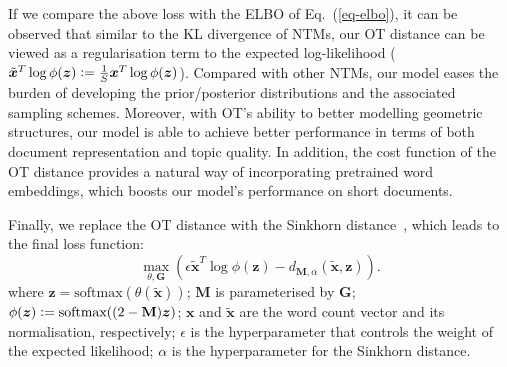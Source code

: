 \documentclass{article}
\renewcommand{\vec}{\boldsymbol}
\newcommand{\matr}[1]{\mathbf{#1}}
\newcommand{\eqdef}{\vcentcolon=}
\begin{document}
If we compare the above loss with the ELBO of Eq.~(\ref{eq-elbo}), it can be observed that similar to the KL divergence of NTMs, our OT distance can be viewed as a regularisation term to the expected log-likelihood ($\tilde{\vec{x}}^T \log \phi(\vec{z})\eqdef \frac{1}{S}\vec{x}^T \log \phi(\vec{z})$).
Compared with other NTMs, our model eases the burden of developing the prior/posterior distributions and the associated sampling schemes. 
Moreover, with OT's ability to better modelling geometric structures, our model is able to achieve better performance in terms of both document representation and topic quality.
In addition, the cost function of the OT distance provides a natural way of incorporating pretrained word embeddings, which boosts our model's performance on short documents.

Finally, we replace the OT distance with the Sinkhorn distance~\citep{cuturi2013sinkhorn}, which leads to the final loss function:
\begin{equation}
\label{eq-final-loss}
\max_{\theta, \matr{G}} \left(\epsilon \tilde{\vec{x}}^T \log \phi(\vec{z}) - d_{\matr{M}, \alpha}(\tilde{\vec{x}}, \vec{z})\right).
\end{equation}
where $\vec{z} = \text{softmax}(\theta(\tilde{\vec{x}}))$; $\matr{M}$ is parameterised by $\matr{G}$; $\phi(\vec{z}) \eqdef \text{softmax}((2 - \matr{M}) \vec{z})$; $\vec{x}$ and $\tilde{\vec{x}}$ are the word count vector and its normalisation, respectively; $\epsilon$ is the hyperparameter that controls the weight of the expected likelihood; $\alpha$ is the hyperparameter for the Sinkhorn distance.
\end{document}
